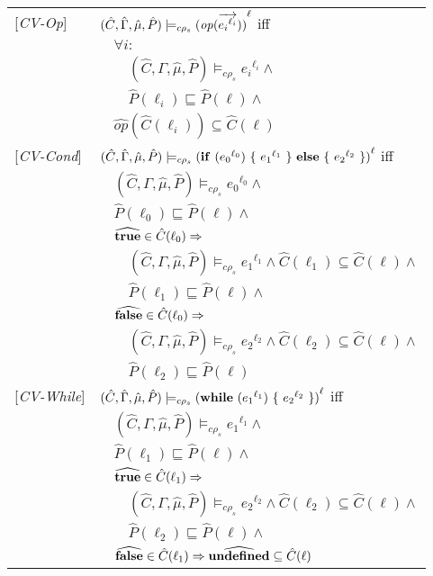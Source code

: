 \documentclass[[12pt,a4paper,twoside,openrigh]{article}
\newcommand{\Cat}[0]{\hat{C}}
\newcommand{\muat}[0]{\hat{\mu}}
\newcommand{\Env}[0]{\hat{\Gamma}}
\newcommand{\Pat}[0]{\hat{P}}
\newcommand{\cenvs}{(\Cat,\Env,\muat,\Pat)}
\newcommand{\ccest}[1]{\cenvs \models_{c \rho_s} #1}
\newcommand{\ccestl}[1]{\cenvs \models_{c \rho_s} {(#1)}^{\ell}}
\newcommand{\lbt}[1]{{e_#1}^{\ell_#1}}
\begin{document}
\begin{tabular}{l l l l}
{[\textit{CV-Op}]}&\multicolumn{3}{l}{$ \ccestl {\op (\vec{\lbt i})} $ iff}\\
&&\multicolumn{2}{l}{$\forall i :$}\\
&&&$\ccest {\lbt i} \wedge $\\
&&&$\Pat(\ell_i) \sqsubseteq \Pat(\ell) \wedge$\\
&&\multicolumn{2}{l}{$\widehat{op} (\Cat(\ell_i)) \subseteq \Cat(\ell) $}\\
{[\textit{CV-Cond}]}&\multicolumn{3}{l}{$\ccestl{\cond {\lbt 0} {\lbt 1} {\lbt 2}} $ iff}\\
&&\multicolumn{2}{l}{$ \ccest {\lbt 0} \wedge $}\\
&&\multicolumn{2}{l}{$\Pat(\ell_0) \sqsubseteq \Pat(\ell) \wedge$} \\
&&\multicolumn{2}{l}{$\widehat{\true} \in \Cat(\ell_0) \Rightarrow$}\\
&&&$\ccest {\lbt 1} \wedge \Cat(\ell_1) \subseteq \Cat(\ell)\wedge$\\
&&&$\Pat(\ell_1) \sqsubseteq \Pat(\ell) \wedge$ \\
&&\multicolumn{2}{l}{$\widehat{\false} \in \Cat(\ell_0) \Rightarrow$}\\
&&&$\ccest {\lbt 2} \wedge \Cat(\ell_2) \subseteq \Cat(\ell) \wedge$\\
&&&$\Pat(\ell_2) \sqsubseteq \Pat(\ell)$ \\
{[\textit{CV-While}]}&\multicolumn{3}{l}{$\ccestl {\while {\lbt 1} {\lbt 2}} $ iff}\\
&&\multicolumn{2}{l}{$ \ccest {\lbt 1} \wedge $}\\
&&\multicolumn{2}{l}{$\Pat(\ell_1) \sqsubseteq \Pat(\ell) \wedge$} \\
&&\multicolumn{2}{l}{$\widehat{\true} \in \Cat(\ell_1) \Rightarrow$}\\
&&&$\ccest {\lbt 2} \wedge \Cat(\ell_2) \subseteq \Cat(\ell) \wedge$\\
&&&$ \Pat(\ell_2) \sqsubseteq \Pat(\ell) \wedge$\\
&&\multicolumn{2}{l}{$\widehat{\false} \in \Cat(\ell_1) \Rightarrow \widehat{\undef} \subseteq \Cat(\ell)$}\\
\end{tabular}
\end{document}
